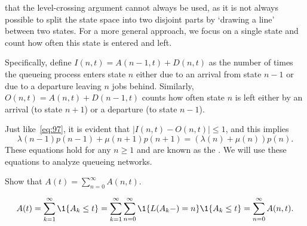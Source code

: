  that the level-crossing argument cannot always be used, as it is not always possible to split the state space into two disjoint parts by `drawing a line' between two states.
For a more general approach, we focus on a single state and count how often this state is entered and left.
\begin{marginfigure}
\end{marginfigure}
Specifically, define $I(n,t) = A(n-1,t) + D(n,t)$ as the number of times the queueing process enters state $n$ either due to an arrival from state $n-1$ or due to a departure leaving $n$ jobs behind. Similarly,  $O(n,t) = A(n,t) + D(n-1,t)$ counts how often state $n$ is left either by an arrival (to state $n+1$) or a departure (to state $n-1$).


Just like~\eqref{eq:97}, it is evident that $|I(n,t)-O(n,t)|\leq 1$, and this implies
\begin{equation}\label{eq:104}
 \lambda(n-1)p(n-1)+\mu(n+1)p(n+1) = (\lambda(n)+\mu(n))p(n).
\end{equation}
These equations hold for any $n\geq 1$ and are known as the .
We will use these equations to analyze queueing networks.




\begin{exercise}\label{ex:36}
 Show that $A(t) =\sum_{n=0}^\infty A(n,t)$.
\begin{solution}
 \begin{equation*}
A(t) = \sum_{k=1}^\infty \1{A_k \leq t} = \sum_{k=1}^\infty \sum_{n=0}^\infty \1{\L(A_k-) = n} \1{A_k \leq t}  = \sum_{n=0}^\infty A(n,t).
 \end{equation*}
\end{solution}
\end{exercise}

